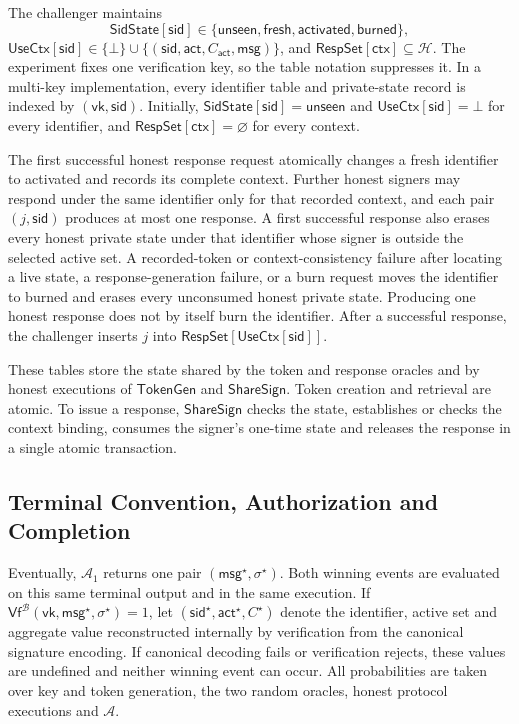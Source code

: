 \documentclass[lettersize,journal]{IEEEtran}
\begin{document}
The challenger maintains
\[
\mathsf{SidState}[\mathsf{sid}]\in
\{\mathsf{unseen},\mathsf{fresh},\mathsf{activated},\mathsf{burned}\},
\]
$\mathsf{UseCtx}[\mathsf{sid}]\in
\{\bot\}\cup\{(\mathsf{sid},\mathsf{act},C_{\mathsf{act}},\mathsf{msg})\}$,
and $\mathsf{RespSet}[\mathsf{ctx}]\subseteq\mathcal H$.
The experiment fixes one verification key, so the table notation
suppresses it. In a multi-key implementation, every identifier table and
private-state record is indexed by $(\mathsf{vk},\mathsf{sid})$.
Initially, $\mathsf{SidState}[\mathsf{sid}]=\mathsf{unseen}$ and
$\mathsf{UseCtx}[\mathsf{sid}]=\bot$ for every identifier, and
$\mathsf{RespSet}[\mathsf{ctx}]=\varnothing$ for every context.

The first successful honest response request atomically changes a fresh
identifier to activated and records its complete context. Further honest
signers may respond under the same identifier only for that recorded
context, and each pair $(j,\mathsf{sid})$ produces at most one response.
A first successful response also erases every honest private state under
that identifier whose signer is outside the selected active set. A
recorded-token or context-consistency failure after locating a live state,
a response-generation failure, or a burn request moves the identifier to
burned and erases every unconsumed honest private state. Producing one
honest response does not by itself burn the identifier. After a successful
response, the challenger inserts $j$ into
$\mathsf{RespSet}[\mathsf{UseCtx}[\mathsf{sid}]]$.

These tables store the state shared by the token and response oracles and
by honest executions of $\mathsf{TokenGen}$ and $\mathsf{ShareSign}$.
Token creation and retrieval are atomic. To issue a response,
$\mathsf{ShareSign}$ checks the state, establishes or checks the context
binding, consumes the signer's one-time state and releases the response
in a single atomic transaction.

\subsection{Terminal Convention, Authorization and Completion}
Eventually, $\mathcal A_1$ returns one pair
$(\mathsf{msg}^{\star},\sigma^{\star})$. Both winning events are evaluated
on this same terminal output and in the same execution. If
$\mathsf{Vf}^{\mathcal B}(\mathsf{vk},\mathsf{msg}^{\star},
\sigma^{\star})=1$, let
$(\mathsf{sid}^{\star},\mathsf{act}^{\star},C^{\star})$ denote the
identifier, active set and aggregate value reconstructed internally by
verification from the canonical signature encoding. If canonical decoding
fails or verification rejects, these values are undefined and neither
winning event can occur. All probabilities are taken over key and token
generation, the two random oracles, honest protocol executions and
$\mathcal A$.
\end{document}
